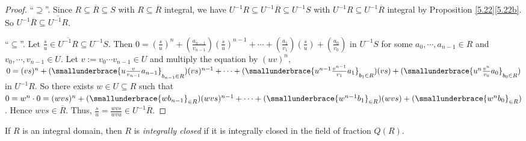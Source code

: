 \begin{proof}
    ``$\supseteq$''. Since $R \subseteq \overbar{R} \subseteq S$ with $R \subseteq \overbar{R}$ integral, we have $U^{-1}R \subseteq U^{-1}\overbar{R} \subseteq U^{-1}S$ with $U^{-1}R \subseteq U^{-1}\overbar{R}$ integral by Proposition \ref{5.22}\ref{5.22b}. So $U^{-1} \overbar{R} \subseteq \overbar{U^{-1}R}$. \par 
    ``$\subseteq$''. Let $\frac{s}{u} \in \overbar{U^{-1}R} \subseteq U^{-1}S$. Then $0 = (\frac{s}{u})^{n} + (\frac{a_{n-1}}{v_{n-1}})(\frac{s}{u})^{n-1} + \cdots + (\frac{a_1}{v_1})(\frac{s}{u}) + (\frac{a_0}{v_0})$ in $U^{-1}S$ for some $a_0,\cdots,a_{n-1} \in R$ and $v_0,\cdots,v_{n-1} \in U$. Let $v := v_0 \cdots v_{n-1} \in U$ and multiply the equation by $(uv)^{n}$, $0 = (vs)^{n} + (\smallunderbrace{u\frac{v}{v_{n-1}}a_{n-1}}_{b_{n-1} \in R})(vs)^{n-1} + \cdots + (\smallunderbrace{u^{n-1} \frac{v^{n-1}}{v_1}a_1}_{b_1 \in R})(vs) + (\smallunderbrace{u^{n}\frac{v^{n}}{v_0}a_0}_{b_0 \in R})$ in $U^{-1}R$. So there exists $w \in U \subseteq R$ such that $0 = w^n \cdot 0 = (wvs)^{n} + (\smallunderbrace{wb_{n-1}}_{\in R})(wvs)^{n-1} + \cdots + (\smallunderbrace{w^{n-1}b_1}_{\in R})(wvs) + (\smallunderbrace{w^{n}b_0}_{\in R})$. Hence $wvs \in \overbar{R}$. Thus, $\frac{s}{u} = \frac{wvs}{wvu} \in U^{-1}\overbar{R}$.
\end{proof}

\begin{definition}\label{5.31}
    If $R$ is an integral domain, then $R$ is \emph{integrally closed} if it is integrally closed in the field of fraction $Q(R)$. 
\end{definition}

